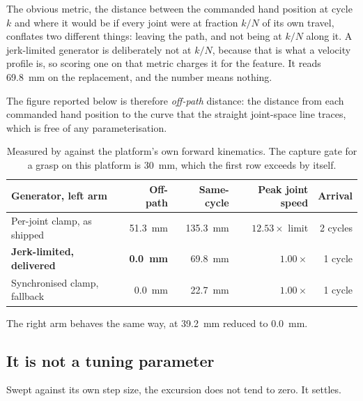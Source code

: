 The obvious metric, the distance between the commanded hand position at cycle
$k$ and where it would be if every joint were at fraction $k/N$ of its own
travel, conflates two different things: leaving the path, and not being at
$k/N$ along it. A jerk-limited generator is deliberately not at $k/N$, because
that is what a velocity profile is, so scoring one on that metric charges it
for the feature. It reads \SI{69.8}{\milli\metre} on the replacement, and the
number means nothing.

The figure reported below is therefore \emph{off-path} distance: the distance
from each commanded hand position to the curve that the straight joint-space
line traces, which is free of any parameterisation.

\begin{table}[htbp]
  \centering
  \caption[Motion generation]{Measured by 
  against the platform's own forward kinematics. The capture gate for a grasp
  on this platform is \SI{30}{\milli\metre}, which the first row exceeds by
  itself.}
  \label{tab:motiongen}
  \begin{tabular}{@{}lrrrr@{}}
    \toprule
    Generator, left arm & Off-path & Same-cycle & Peak joint speed & Arrival \\
    \midrule
    Per-joint clamp, as shipped & \SI{51.3}{\milli\metre} &
      \SI{135.3}{\milli\metre} & $12.53\times$ limit & 2 cycles \\
    \textbf{Jerk-limited, delivered} & \textbf{\SI{0.0}{\milli\metre}} &
      \SI{69.8}{\milli\metre} & $1.00\times$ & 1 cycle \\
    Synchronised clamp, fallback & \SI{0.0}{\milli\metre} &
      \SI{22.7}{\milli\metre} & $1.00\times$ & 1 cycle \\
    \bottomrule
  \end{tabular}
\end{table}

The right arm behaves the same way, at \SI{39.2}{\milli\metre} reduced to
\SI{0.0}{\milli\metre}.

\subsection{It is not a tuning parameter}

Swept against its own step size, the excursion does not tend to zero. It
settles.

